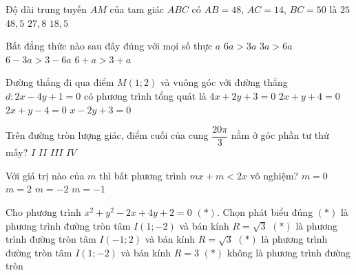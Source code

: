\begin{ex}%
Độ dài trung tuyến $AM$ của tam giác $ABC$ có $AB=48$, $AC=14$, $BC=50$ là
\choice
{\True $25$}
{$48,5$}
{$27,8$}
{$18,5$}
\end{ex}
\begin{ex}%
Bất đẳng thức nào sau đây đúng với mọi số thực $a$
\choice
{$6a>3a$}
{$3a>6a$}
{$6-3a>3-6a$}
{\True $6+a>3+a$}
\end{ex}
\begin{ex}%
Đường thẳng đi qua điểm $M(1;2)$ và vuông góc với đường thẳng $d: 2x-4y+1=0$ có phương trình tổng quát là
\choice
{$4x+2y+3=0$}
{$2x+y+4=0$}
{\True $2x+y-4=0$}
{$x-2y+3=0$}
\end{ex}
\begin{ex}%
Trên đường tròn lượng giác, điểm cuối của cung $\dfrac{20 \pi}{3}$ nằm ở góc phần tư thứ mấy?
\choice
{$I$}
{\True $II$}
{$III$}
{$IV$}
\end{ex}
\begin{ex}%
Với giá trị nào của $m$ thì bất phương trình $mx + m < 2x$ vô nghiệm?
\choice
{$m=0$}
{\True $m=2$}
{$m=-2$}
{$m=-1$}
\end{ex}
\begin{ex}%
Cho phương trình $x^2 + y^2 - 2x + 4y + 2 = 0$ $(*)$. Chọn phát biểu đúng
\choice
{\True $(*)$ là phương trình đường tròn tâm $I(1;-2)$ và bán kính $R = \sqrt{3}$}
{$(*)$ là phương trình đường tròn tâm $I(-1;2)$ và bán kính $R = \sqrt{3}$}
{$(*)$ là phương trình đường tròn tâm $I(1;-2)$ và bán kính $R = 3$}
{$(*)$ không là phương trình đường tròn}
\end{ex}
